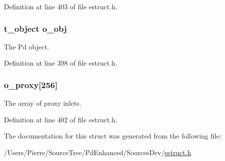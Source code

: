 Definition at line 403 of file estruct.\-h.

\hypertarget{struct__eobj_a8cffa8f3338cca7779ab922dab19227c}{
\subsubsection[{o\-\_\-obj}]{\setlength{\rightskip}{0pt plus 5cm}t\-\_\-object o\-\_\-obj}}\label{struct__eobj_a8cffa8f3338cca7779ab922dab19227c}
The Pd object. 

Definition at line 398 of file estruct.\-h.

\hypertarget{struct__eobj_a9435dcf0a1aed105a4c38d24dfc65dbf}{
\subsubsection[{o\-\_\-proxy}]{ o\-\_\-proxy\mbox{[}256\mbox{]}}}\label{struct__eobj_a9435dcf0a1aed105a4c38d24dfc65dbf}
The array of proxy inlets. 

Definition at line 402 of file estruct.\-h.



The documentation for this struct was generated from the following file\-:\begin{DoxyCompactItemize}
\item 
/\-Users/\-Pierre/\-Source\-Tree/\-Pd\-Enhanced/\-Sources\-Dev/\hyperlink{estruct_8h}{estruct.\-h}\end{DoxyCompactItemize}
